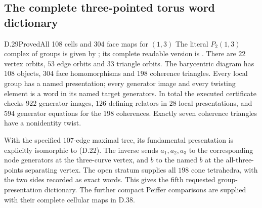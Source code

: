 \subsection{The complete three-pointed torus word dictionary}

\begin{result}{D.29}{Proved}{All 108 cells and 304 face maps for $(1,3)$}
The literal $P_2(1,3)$ complex of groups is given by
; its complete readable
version is .
There are $22$ vertex orbits, $53$ edge orbits and $33$
triangle orbits.  The barycentric diagram has $108$ objects,
$304$ face homomorphisms and $198$ coherence triangles.
Every local group has a named presentation; every generator
image and every twisting element is a word in its named
target generators.  In total the executed certificate checks
$922$ generator images, $126$ defining relators in $28$
local presentations, and $594$ generator equations for the
$198$ coherences.  Exactly seven coherence triangles have
a nonidentity twist.

With the specified $107$-edge maximal tree, its fundamental
presentation is explicitly isomorphic to (D.22).
The inverse sends $a_1,a_2,a_3$ to the corresponding node
generators at the three-curve vertex, and $b$ to the named
$b$ at the all-three-points separating vertex.
The open stratum supplies all $198$ cone tetrahedra,
with the two sides recorded as exact words.  This gives
the fifth requested group-presentation dictionary.
The further compact Peiffer comparisons are supplied
with their complete cellular maps in D.38.
\end{result}
